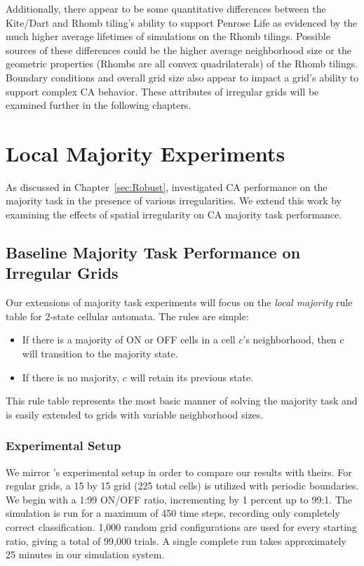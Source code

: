 \documentclass[a4paper,11pt]{report}
\begin{document}
Additionally, there appear to be some quantitative differences between the Kite/Dart and Rhomb tiling's ability to support Penrose Life as evidenced by the much higher average lifetimes of simulations on the Rhomb tilings. Possible sources of these differences could be the higher average neighborhood size or the geometric properties (Rhombs are all convex quadrilaterals) of the Rhomb tilings. Boundary conditions and overall grid size also appear to impact a grid's ability to support complex CA behavior. These attributes of irregular grids will be examined further in the following chapters.

\processdelayedfloats


\chapter{Local Majority Experiments}
\label{ch:local_maj}

As discussed in Chapter~\ref{sec:Robust}, \citeauthor{me07} investigated CA performance on the majority task in the presence of various irregularities. We extend this work by examining the effects of spatial irregularity on CA majority task performance.

\section{Baseline Majority Task Performance on Irregular Grids}

Our extensions of majority task experiments will focus on the \textit{local majority} rule table for 2-state cellular automata. The rules are simple:

\begin{itemize}
\item If there is a majority of ON or OFF cells in a cell $c$'s neighborhood, then $c$ will transition to the majority state.
\item If there is no majority, $c$ will retain its previous state.
\end{itemize}

This rule table represents the most basic manner of solving the majority task and is easily extended to grids with variable neighborhood sizes.

\subsection*{Experimental Setup}
We mirror \citeauthor{me07}'s experimental setup in order to compare our results with theirs. For regular grids, a 15 by 15 grid (225 total cells) is utilized with periodic boundaries. We begin with a 1:99 ON/OFF ratio, incrementing by 1 percent up to 99:1. The simulation is run for a maximum of 450 time steps, recording only completely correct classification. 1,000 random grid configurations are used for every starting ratio, giving a total of 99,000 trials. A single complete run takes approximately 25 minutes in our simulation system.
\end{document}
